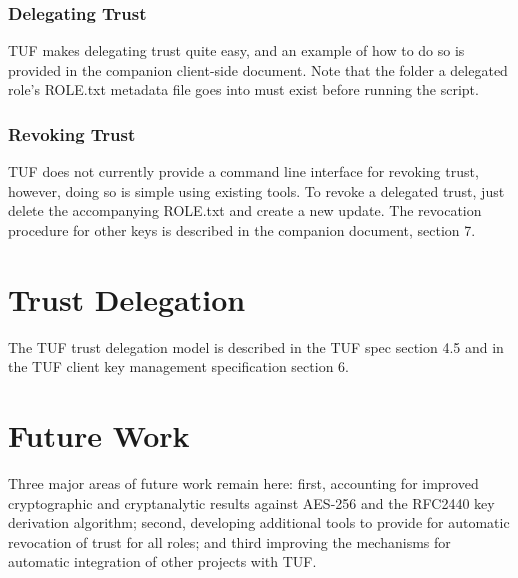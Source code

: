 \documentclass{article}
\begin{document}
\subsubsection{Delegating Trust}

TUF makes delegating trust quite easy, and an example of how to do so is provided
in the companion client-side document. Note that the folder a delegated role's
ROLE.txt metadata file goes into must exist before running the script.

\subsubsection{Revoking Trust}
TUF does not currently provide a command line interface for revoking trust,
however, doing so is simple using existing tools. To revoke a delegated
trust, just delete the accompanying ROLE.txt and create a new update. The
revocation procedure for other keys is described in the companion document, section
7.

\section{Trust Delegation}
The TUF trust delegation model is described in the TUF spec section 4.5 and in
the TUF client key management specification section 6.

\section{Future Work}
Three major areas of future work remain here: first, accounting for improved
cryptographic and cryptanalytic results against AES-256 and the RFC2440 key
derivation algorithm; second, developing additional tools to provide for 
automatic revocation of trust for all roles; and third improving the mechanisms
for automatic integration of other projects with TUF.

\end{document}
